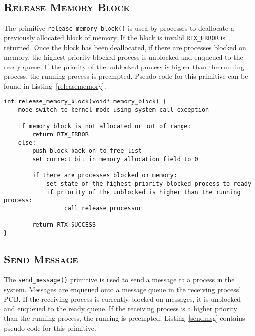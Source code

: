 \documentclass[oneside]{report}
\begin{document}
\subsection{\textsc{Release Memory Block}}

The primitive \texttt{release\_memory\_block()} is used by processes to
deallocate a previously allocated block of memory. If the block is invalid
\texttt{RTX\_ERROR} is returned. Once the block has been deallocated, if there
are processes blocked on memory, the highest priority blocked process is
unblocked and enqueued to the ready queue. If the priority of the unblocked
process is higher than the running process, the running process is preempted.
Pseudo code for this primitive can be found in Listing~\ref{releasememory}.

\begin{lstlisting}
int release_memory_block(void* memory_block) {
    mode switch to kernel mode using system call exception

    if memory block is not allocated or out of range:
        return RTX_ERROR
    else:
        push block back on to free list
        set correct bit in memory allocation field to 0

        if there are processes blocked on memory:
            set state of the highest priority blocked process to ready
            if priority of the unblocked is higher than the running process:
                 call release processor

        return RTX_SUCCESS        
}
\end{lstlisting}

\subsection{\textsc{Send Message}}

The \texttt{send\_message()} primitive is used to send a message to a
process in the system. Messages are enqueued onto a message queue in
the receiving process' PCB. If the receiving process is currently
blocked on messages, it is unblocked and enqueued to the ready
queue. If the receiving process is a higher priority than the running
process, the running is preempted. Listing~\ref{sendmsg} contains
pseudo code for this primitive.
\end{document}
